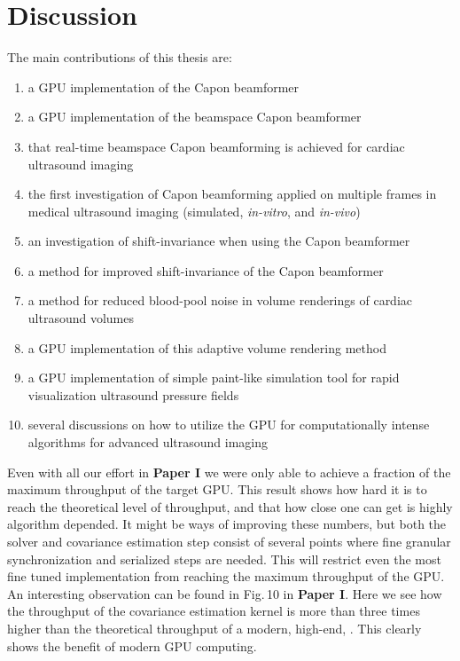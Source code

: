\section{Discussion}
The main contributions of this thesis are:
\begin{enumerate}
\item a GPU implementation of the Capon beamformer
\item a GPU implementation of the beamspace Capon beamformer
\item that real-time beamspace Capon beamforming is achieved for cardiac ultrasound imaging
\item the first investigation of Capon beamforming applied on multiple frames in medical ultrasound imaging (simulated, \textit{in-vitro}, and \textit{in-vivo})
\item an investigation of shift-invariance when using the Capon beamformer
\item a method for improved shift-invariance of the Capon beamformer
\item a method for reduced blood-pool noise in volume renderings of cardiac ultrasound volumes
\item a GPU implementation of this adaptive volume rendering method
\item a GPU implementation of simple paint-like simulation tool for rapid visualization ultrasound pressure fields
\item several discussions on how to utilize the GPU for computationally intense algorithms for advanced ultrasound imaging 
\end{enumerate}

Even with all our effort in \textbf{Paper I} we were only able to achieve a fraction of the maximum throughput of the target GPU. This result shows how hard it is to reach the theoretical level of throughput, and that how close one can get is highly algorithm depended. It might be ways of improving these numbers, but both the solver and covariance estimation step consist of several points where fine granular synchronization and serialized steps are needed. This will restrict even the most fine tuned implementation from reaching the maximum throughput of the GPU. An interesting observation can be found in Fig.\,10 in \textbf{Paper I}. Here we see how the throughput of the covariance estimation kernel is more than three times higher than the theoretical throughput of a modern, high-end, . This clearly shows the benefit of modern GPU computing. 

